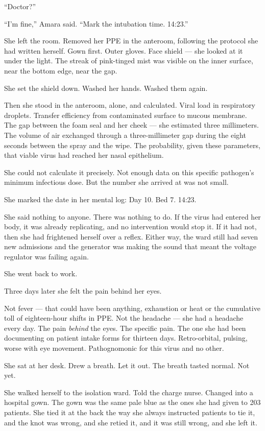 ``Doctor?''

``I'm fine,'' Amara said. ``Mark the intubation time. 14:23.''

She left the room. Removed her PPE in the anteroom, following the protocol she had written herself. Gown first. Outer gloves. Face shield --- she looked at it under the light. The streak of pink-tinged mist was visible on the inner surface, near the bottom edge, near the gap.

She set the shield down. Washed her hands. Washed them again.

Then she stood in the anteroom, alone, and calculated. Viral load in respiratory droplets. Transfer efficiency from contaminated surface to mucous membrane. The gap between the foam seal and her cheek --- she estimated three millimeters. The volume of air exchanged through a three-millimeter gap during the eight seconds between the spray and the wipe. The probability, given these parameters, that viable virus had reached her nasal epithelium.

She could not calculate it precisely. Not enough data on this specific pathogen's minimum infectious dose. But the number she arrived at was not small.

She marked the date in her mental log: Day 10. Bed 7. 14:23.

She said nothing to anyone. There was nothing to do. If the virus had entered her body, it was already replicating, and no intervention would stop it. If it had not, then she had frightened herself over a reflex. Either way, the ward still had seven new admissions and the generator was making the sound that meant the voltage regulator was failing again.

She went back to work.

Three days later she felt the pain behind her eyes.

Not fever --- that could have been anything, exhaustion or heat or the cumulative toll of eighteen-hour shifts in PPE. Not the headache --- she had a headache every day. The pain \emph{behind} the eyes. The specific pain. The one she had been documenting on patient intake forms for thirteen days. Retro-orbital, pulsing, worse with eye movement. Pathognomonic for this virus and no other.

She sat at her desk. Drew a breath. Let it out. The breath tasted normal. Not yet.

She walked herself to the isolation ward. Told the charge nurse. Changed into a hospital gown. The gown was the same pale blue as the ones she had given to 203 patients. She tied it at the back the way she always instructed patients to tie it, and the knot was wrong, and she retied it, and it was still wrong, and she left it.

